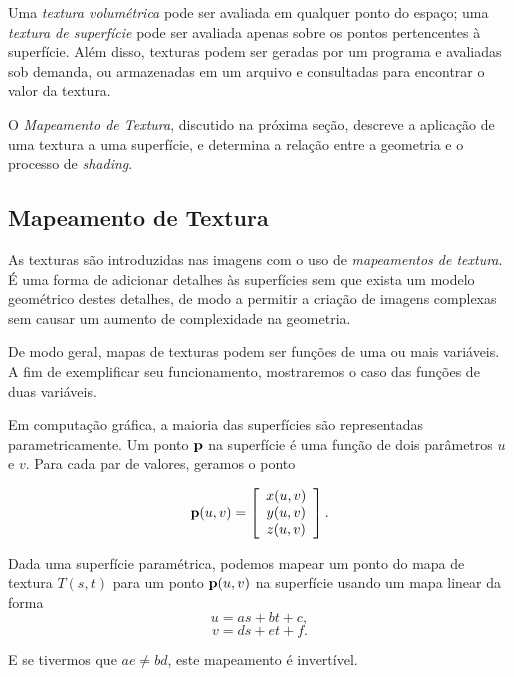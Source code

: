 \documentclass[12pt, a4paper, oneside]{book}
\begin{document}
Uma {\it textura volumétrica} pode ser avaliada em qualquer ponto do espaço; uma {\it textura de superfície} pode ser avaliada apenas sobre os pontos pertencentes à superfície. Além disso, texturas podem ser geradas por um programa e avaliadas sob demanda, ou armazenadas em um arquivo e consultadas para encontrar o valor da textura.

O {\it Mapeamento de Textura}, discutido na próxima seção, descreve a aplicação de uma textura a uma superfície, e determina a relação entre a geometria e o processo de {\it shading}.

\subsection{Mapeamento de Textura}

As texturas são introduzidas nas imagens com o uso de {\it mapeamentos de textura}. É uma forma de adicionar detalhes às superfícies sem que exista um modelo geométrico destes detalhes, de modo a permitir a criação de imagens complexas sem causar um aumento de complexidade na geometria.

De modo geral, mapas de texturas podem ser funções de uma ou mais variáveis. A fim de exemplificar seu funcionamento, mostraremos o caso das funções de duas variáveis.

Em computação gráfica, a maioria das superfícies são representadas parametricamente. Um ponto ${\bf p}$ na superfície é uma função de dois parâmetros $u$ e $v$. Para cada par de valores, geramos o ponto

\[
{\bf p}(u,v) = \left[ \begin{array}{c} x(u,v) \\ y(u,v) \\ z(u,v) \end{array} \right].
\]

Dada uma superfície paramétrica, podemos mapear um ponto do mapa de textura $T(s,t)$ para um ponto ${\bf p}(u,v)$ na superfície usando um mapa linear da forma
\[ u = as + bt + c, 
\]
\[ v = ds + et + f.
\]

E se tivermos que $ae \neq bd$, este mapeamento é invertível. 
\end{document}
